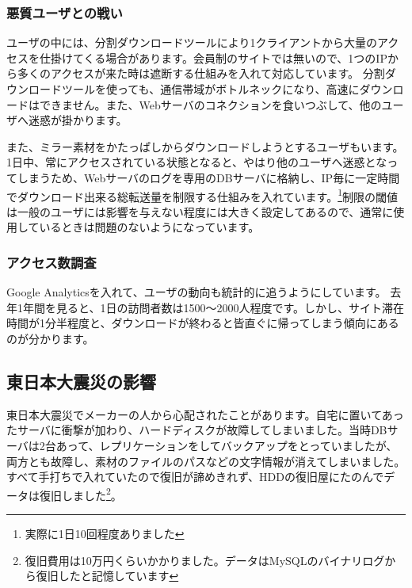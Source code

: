 \subsubsection{悪質ユーザとの戦い}

ユーザの中には、分割ダウンロードツールにより1クライアントから大量のアクセスを仕掛けてくる場合があります。会員制のサイトでは無いので、1つのIPから多くのアクセスが来た時は遮断する仕組みを入れて対応しています。%
分割ダウンロードツールを使っても、通信帯域がボトルネックになり、高速にダウンロードはできません。また、Webサーバのコネクションを食いつぶして、他のユーザへ迷惑が掛かります。

また、ミラー素材をかたっぱしからダウンロードしようとするユーザもいます。1日中、常にアクセスされている状態となると、やはり他のユーザへ迷惑となってしまうため、Webサーバのログを専用のDBサーバに格納し、IP毎に一定時間でダウンロード出来る総転送量を制限する仕組みを入れています。\footnote{実際に1日10回程度ありました}制限の閾値は一般のユーザには影響を与えない程度には大きく設定してあるので、通常に使用しているときは問題のないようになっています。


\subsubsection{アクセス数調査}
Google Analyticsを入れて、ユーザの動向も統計的に追うようにしています。
去年1年間を見ると、1日の訪問者数は1500～2000人程度です。しかし、サイト滞在時間が1分半程度と、ダウンロードが終わると皆直ぐに帰ってしまう傾向にあるのが分かります。

\subsection{東日本大震災の影響}
%

東日本大震災でメーカーの人から心配されたことがあります。自宅に置いてあったサーバに衝撃が加わり、ハードディスクが故障してしまいました。当時DBサーバは2台あって、レプリケーションをしてバックアップをとっていましたが、両方とも故障し、素材のファイルのパスなどの文字情報が消えてしまいました。すべて手打ちで入れていたので復旧が諦めきれず、HDDの復旧屋にたのんでデータは復旧しました\footnote{復旧費用は10万円くらいかかりました。データはMySQLのバイナリログから復旧したと記憶しています}。

